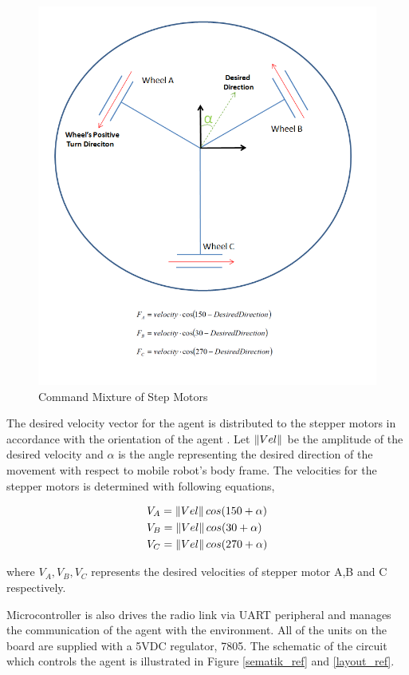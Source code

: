 \begin{figure}[H]
\caption{Command Mixture of Step Motors} \label{ccmb_ref}
\centerline{\includegraphics[scale = 0.70]{ccmb}}
\end{figure} 

The desired velocity vector for the agent is  distributed to the stepper motors in accordance with the orientation of the agent . Let $\left\lVert Vel\right\rVert$ be the amplitude of the desired velocity and $\alpha$ is the angle representing the desired direction of the movement with respect to mobile robot's body frame.  The velocities for the stepper motors is determined with following equations,
		
\begin{align*}
& V_A = \left\lVert Vel\right\rVert cos(150+\alpha) \\
& V_B = \left\lVert Vel\right\rVert cos(30 +\alpha) \\
& V_C = \left\lVert Vel\right\rVert cos(270+\alpha) 
\end{align*}  

where $V_A, V_B, V_C$ represents the desired velocities of  stepper motor A,B and C respectively.
		
Microcontroller is also drives the radio link via UART peripheral and manages the communication of the agent with the environment. All of the units on the board are supplied with a 5VDC regulator, 7805. The schematic of the circuit which controls the agent is illustrated in Figure \ref{sematik_ref} and \ref{layout_ref}.
		

